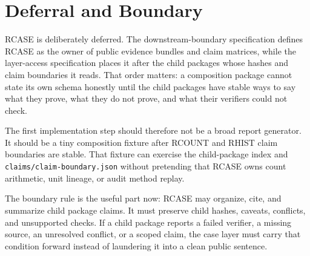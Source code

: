 \section{Deferral and Boundary}

RCASE is deliberately deferred. The downstream-boundary specification defines
RCASE as the owner of public evidence bundles and claim matrices, while the
layer-access specification places it after the child packages whose hashes and
claim boundaries it reads. That order matters: a composition package cannot
state its own schema honestly until the child packages have stable ways to say
what they prove, what they do not prove, and what their verifiers could not
check.

The first implementation step should therefore not be a broad report generator.
It should be a tiny composition fixture after RCOUNT and RHIST claim boundaries
are stable. That fixture can exercise the child-package index and
\texttt{claims/claim-boundary.json} without pretending that RCASE owns count
arithmetic, unit lineage, or audit method replay.

The boundary rule is the useful part now: RCASE may organize, cite, and
summarize child package claims. It must preserve child hashes, caveats,
conflicts, and unsupported checks. If a child package reports a failed verifier,
a missing source, an unresolved conflict, or a scoped claim, the case layer must
carry that condition forward instead of laundering it into a clean public
sentence.
